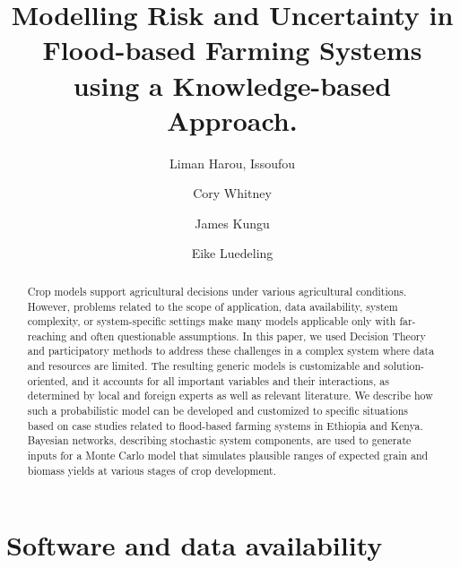 \documentclass[]{elsarticle} %
\begin{document}
\begin{frontmatter}

  \title{Modelling Risk and Uncertainty in Flood-based Farming Systems using a Knowledge-based Approach.}
    \author[KU,ICRAF]{Liman Harou, Issoufou}
    \author[INRES]{Cory Whitney}
    \author[KU]{James Kungu}
    \author[INRES]{Eike Luedeling}
      \address[KU]{Kenyatta University, Department of Environmental Sciences, P.O. Box 43844 00100 Nairobi, Kenya}
    \address[ICRAF]{World Agroforestry Centre (ICRAF), United Nations Avenue, Gigiri, P.O. Box 30677-00100, Nairobi, Kenya}
    \address[INRES]{University of Bonn, Department of Horticultural Sciences, Auf dem Hügel 6, D-53121, Bonn, Germany}
    \address[ZEF]{Center for Development research (ZEF), University of Bonn, Genscherallee 3, D-53113, Bonn, Germany}
    
  \begin{abstract}
  Crop models support agricultural decisions under various agricultural conditions. However, problems related to the scope of application, data availability, system complexity, or system-specific settings make many models applicable only with far-reaching and often questionable assumptions. In this paper, we used Decision Theory and participatory methods to address these challenges in a complex system where data and resources are limited. The resulting generic models is customizable and solution-oriented, and it accounts for all important variables and their interactions, as determined by local and foreign experts as well as relevant literature. We describe how such a probabilistic model can be developed and customized to specific situations based on case studies related to flood-based farming systems in Ethiopia and Kenya. Bayesian networks, describing stochastic system components, are used to generate inputs for a Monte Carlo model that simulates plausible ranges of expected grain and biomass yields at various stages of crop development.
  \end{abstract}
  
 \end{frontmatter}

\hypertarget{software-and-data-availability}{%
\section*{Software and data availability}\label{software-and-data-availability}}
\end{document}
